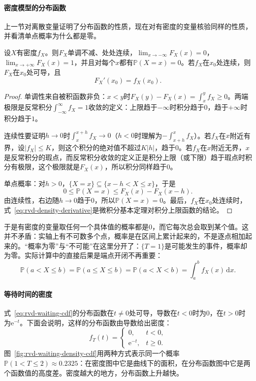 \paragraph{密度模型的分布函数}
上一节对离散变量证明了分布函数的性质，现在对有密度的变量核验同样的性质，并看清单点概率为什么都是零。

\begin{theorem}[有密度时的分布函数]
\label{thm:rvd-density-cdf}
设$X$有密度$f_X$。则$F_X$单调不减、处处连续，$\lim_{x\to-\infty}F_X(x)=0$，$\lim_{x\to+\infty}F_X(x)=1$，并且对每个$x$都有$\mathbb{P}(X=x)=0$。若$f_X$在$x_0$处连续，则$F_X$在$x_0$处可导，且
\begin{equation}
  F_X'(x_0)=f_X(x_0).
  \label{eq:rvd-density-derivative}
\end{equation}
\end{theorem}

\begin{proof}
单调性来自被积函数非负：$x<y$时$F_X(y)-F_X(x)=\int_x^yf_X\geq0$。两端极限是反常积分$\int_{-\infty}^{\infty}f_X=1$收敛的定义：上限趋于$-\infty$时积分趋于$0$，趋于$+\infty$时积分趋于$1$。

连续性要证明$h\to0$时$\int_x^{x+h}f_X\to0$（$h<0$时理解为$-\int_{x+h}^{x}f_X$）。若$f_X$在$x$附近有界，设$\lvert f_X\rvert\leq K$，则这个积分的绝对值不超过$K\lvert h\rvert$，趋于$0$。若$f_X$在$x$附近无界，$x$是反常积分的瑕点，而反常积分收敛的定义正是积分上限（或下限）趋于瑕点时积分有极限，这个极限就是$F_X(x)$，所以积分同样趋于$0$。

单点概率：对$h>0$，$\{X=x\}\subseteq\{x-h<X\leq x\}$，于是
\[
  0\leq\mathbb{P}(X=x)\leq F_X(x)-F_X(x-h).
\]
由连续性，右边随$h\to0$趋于$0$，所以$\mathbb{P}(X=x)=0$。最后，$f_X$在$x_0$处连续时，式~\eqref{eq:rvd-density-derivative}是微积分基本定理对积分上限函数的结论。
\end{proof}

于是有密度的变量取任何一个具体值的概率都是$0$，而它每次总会取到某个值。这并不矛盾：实轴上有不可数多个点，概率是在区间上累计起来的，不是逐点相加起来的。“概率为零”与“不可能”在这里分开了：$\{T=1\}$是可能发生的事件，概率却为零。实际计算中的直接后果是端点开闭不再重要：
\[
  \mathbb{P}(a<X\leq b)=\mathbb{P}(a\leq X\leq b)=\mathbb{P}(a<X<b)=\int_a^bf_X(x)\,\mathrm{d}x .
\]

\paragraph{等待时间的密度}
式~\eqref{eq:rvd-waiting-cdf}的分布函数在$t\neq0$处可导，导数在$t<0$时为$0$，在$t>0$时为$\mathrm{e}^{-t}$。下面会说明，这样的分布函数由导数给出密度：
\[
  f_T(t)=\begin{cases}0,&t<0,\\\mathrm{e}^{-t},&t\geq0.\end{cases}
\]
图~\ref{fig:rvd-waiting-density-cdf}用两种方式表示同一个概率$\mathbb{P}(1<T\leq2)\approx0.2325$：在密度图中它是曲线下的面积，在分布函数图中它是两个函数值的高度差。密度越大的地方，分布函数上升越快。

